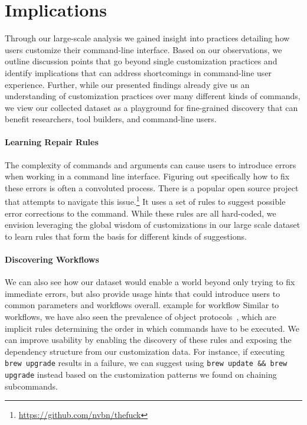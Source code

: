 \section{Implications}

Through our large-scale analysis 
we gained insight into practices detailing how users customize their command-line interface.
Based on our observations, we outline discussion points that go beyond single customization practices and identify implications that can address shortcomings in command-line user experience.
Further, while our presented findings already give us an understanding of customization practices over many different kinds of commands, we view our collected dataset as a playground for fine-grained discovery that can benefit researchers, tool builders, and command-line users.

\paragraph{\bf Learning Repair Rules}

The complexity of commands and arguments can cause users to introduce errors when working in a command line interface.
Figuring out specifically how to fix these errors is often a convoluted process.
There is a popular open source project that attempts to navigate this issue.\footnote{\url{https://github.com/nvbn/thefuck}}
It uses a set of rules to suggest possible error corrections to the command.
While these rules are all hard-coded, we envision leveraging the global wisdom of customizations in our large scale dataset to learn rules that form the basis for different kinds of suggestions.
\paragraph{\bf Discovering Workflows}
We can also see how our dataset would enable a world beyond only trying to fix immediate errors, but also provide usage hints that could introduce users to common parameters and workflows overall.
\TODO example for workflow
Similar to workflows, we have also seen the prevalence of object protocols~\cite{beckman:11}, which are implicit rules determining  the order in which commands have to be executed.
We can improve usability by enabling the discovery of these rules and exposing the dependency structure from our customization data.
For instance, if executing \verb|brew upgrade| results in a failure, we can suggest using \verb|brew update && brew upgrade| instead based on the customization patterns we found on chaining subcommands.

